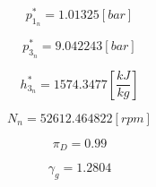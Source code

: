 \documentclass[12pt,english]{article}
\begin{document}
\begin{equation}
  p_{1_{n}}^{*} =  1.01325 [bar]
\end{equation}

\begin{equation}
  p_{3_{n}}^{*} =  9.042243 [bar]
\end{equation}

\begin{equation}
  h_{3_{n}}^{*} =  1574.3477 \left[\frac{kJ}{kg}\right]
\end{equation}

\begin{equation}
  N_{n} = 52612.464822 [rpm]
\end{equation}

\begin{equation}
  \pi_{D} = 0.99
\end{equation}

\begin{equation}
  \gamma_{g} = 1.2804
\end{equation}
\end{document}
